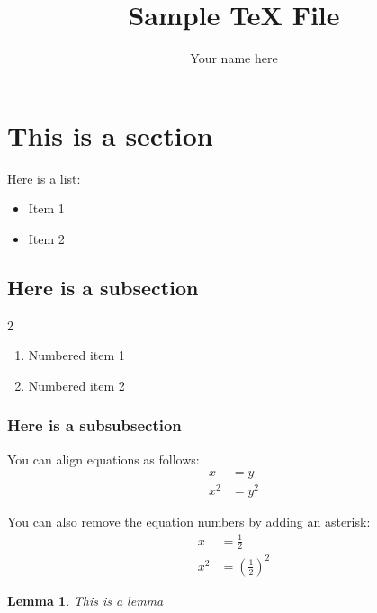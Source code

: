 \documentclass[12pt]{article}
\newtheorem{lemma}{Lemma}
\newcommand{\parens}[1]{\left(#1\right)}
\newcommand{\gap}{\vspace{5mm}}
\begin{document}
\title{Sample TeX File}
\author{Your name here}
\date{}

\maketitle

\tableofcontents{}
\newpage

\section{This is a section}
Here is a list:
\begin{itemize}[noitemsep, topsep=0pt, label=-]
\item Item 1
\item Item 2
\end{itemize}

\gap

\subsection{Here is a subsection}
\begin{spreadlines}{2\baselineskip}
\begin{enumerate}
\item Numbered item 1
\item Numbered item 2
\end{enumerate}
\end{spreadlines}

\gap

\subsubsection{Here is a subsubsection}
You can align equations as follows:
\begin{align}
x&=y\\
x^2&=y^2
\end{align}

You can also remove the equation numbers by adding an asterisk:
\begin{align*}
x&=\frac{1}{2}\\
x^2&=\parens{\frac{1}{2}}^2
\end{align*}

\begin{lemma}
This is a lemma
\end{lemma}
\end{document}
